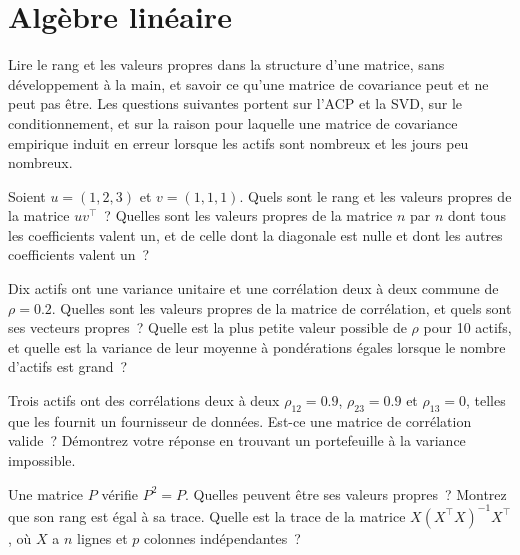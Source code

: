 \chapter[\texorpdfstring{Algèbre\hspace{0.28em}linéaire}{Algèbre linéaire}]{Algèbre linéaire}\label{ch:iv1:linear-algebra}

\begin{ivtrains}
Lire le rang et les valeurs propres dans la structure d'une matrice, sans développement à la main, et savoir ce qu'une matrice de covariance peut et ne peut pas être. Les questions suivantes portent sur l'ACP et la SVD, sur le conditionnement, et sur la raison pour laquelle une matrice de covariance empirique induit en erreur lorsque les actifs sont nombreux et les jours peu nombreux.
\end{ivtrains}

\begin{question}\label{iq:iv1:linear-algebra:1}
Soient $u = (1, 2, 3)$ et $v = (1, 1, 1)$. Quels sont le rang et les valeurs propres de la matrice $uv^\top$~? Quelles sont les valeurs propres de la matrice $n$ par $n$ dont tous les coefficients valent un, et de celle dont la diagonale est nulle et dont les autres coefficients valent un~?
\end{question}

\begin{question}\label{iq:iv1:linear-algebra:2}
Dix actifs ont une variance unitaire et une corrélation deux à deux commune de $\rho = 0.2$. Quelles sont les valeurs propres de la matrice de corrélation, et quels sont ses vecteurs propres~? Quelle est la plus petite valeur possible de $\rho$ pour 10 actifs, et quelle est la variance de leur moyenne à pondérations égales lorsque le nombre d'actifs est grand~?
\end{question}

\begin{question}\label{iq:iv1:linear-algebra:3}
Trois actifs ont des corrélations deux à deux $\rho_{12} = 0.9$, $\rho_{23} = 0.9$ et $\rho_{13} = 0$, telles que les fournit un fournisseur de données. Est-ce une matrice de corrélation valide~? Démontrez votre réponse en trouvant un portefeuille à la variance impossible.
\end{question}

\begin{question}\label{iq:iv1:linear-algebra:4}
Une matrice $P$ vérifie $P^2 = P$. Quelles peuvent être ses valeurs propres~? Montrez que son rang est égal à sa trace. Quelle est la trace de la matrice $X(X^\top X)^{-1}X^\top$, où $X$ a $n$ lignes et $p$ colonnes indépendantes~?
\end{question}

